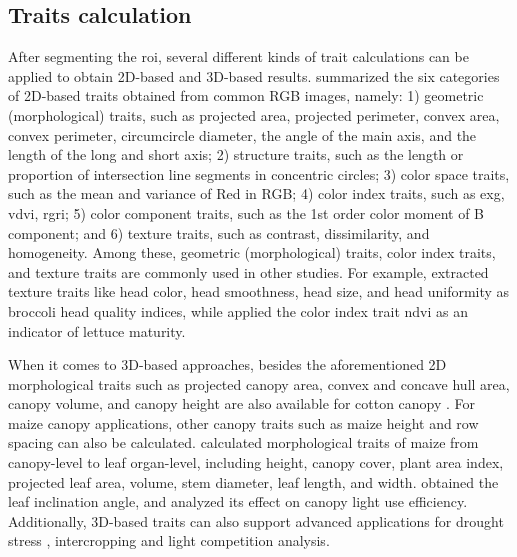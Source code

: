 \subsection{Traits calculation}

After segmenting the \gls{roi}, several different kinds of trait calculations can be applied to obtain 2D-based and 3D-based results. \citet[Table 1]{du_greenhouse_2021} summarized the six categories of 2D-based traits obtained from common RGB images, namely: 1) geometric (morphological) traits, such as projected area, projected perimeter, convex area, convex perimeter, circumcircle diameter, the angle of the main axis, and the length of the long and short axis; 2) structure traits, such as the length or proportion of intersection line segments in concentric circles; 3) color space traits, such as the mean and variance of Red in RGB; 4) color index traits, such as \gls{exg}, \gls{vdvi}, \gls{rgri}; 5) color component traits, such as the 1st order color moment of B component; and 6) texture traits, such as contrast, dissimilarity, and homogeneity. Among these, geometric (morphological) traits, color index traits, and texture traits are commonly used in other studies. For example, \citet{stansell_use_2017} extracted texture traits like head color, head smoothness, head size, and head uniformity as broccoli head quality indices, while \citet{bauer_combining_2019} applied the color index trait \gls{ndvi} as an indicator of lettuce maturity.

When it comes to 3D-based approaches, besides the aforementioned 2D morphological traits such as projected canopy area, convex and concave hull area, canopy volume, and canopy height are also available for cotton canopy \citep{jiang_quantitative_2018}. For maize canopy applications, other canopy traits such as maize height \citep{hammerle_mobile_2018,qiu_field-based_2019} and row spacing \citep{qiu_field-based_2019} can also be calculated. \citet[Table 3]{jin_non-destructive_2020} calculated morphological traits of maize from canopy-level to leaf organ-level, including height, canopy cover, plant area index, projected leaf area, volume, stem diameter, leaf length, and width. \citet{itakura_automatic_2018} obtained the leaf inclination angle, and \citet{liu_canopy_2021} analyzed its effect on canopy light use efficiency. Additionally, 3D-based traits can also support advanced applications for drought stress \citep{su_evaluating_2019, sorrentino_lettuce_2020}, intercropping \citep{liu_field-based_2021} and light competition \citep{zhu_quantification_2020} analysis.

